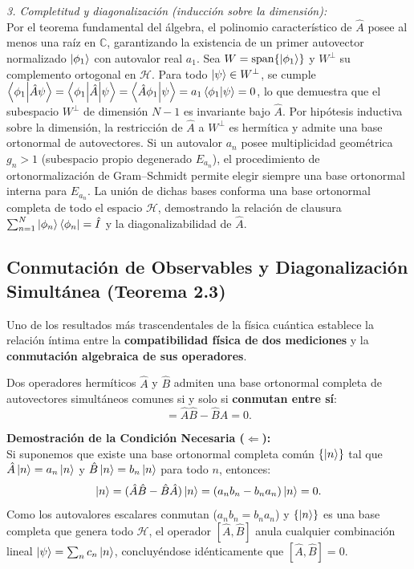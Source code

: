 \textit{3. Completitud y diagonalización (inducción sobre la dimensión):}\\
Por el teorema fundamental del álgebra, el polinomio característico de $\hat{A}$ posee al menos una raíz en $\mathbb{C}$, garantizando la existencia de un primer autovector normalizado $\left| \phi_1 \right\rangle$ con autovalor real $a_1$. Sea $W = \mathrm{span}\{\left| \phi_1 \right\rangle\}$ y $W^\perp$ su complemento ortogonal en $\mathcal{H}$. Para todo $\left| \psi \right\rangle \in W^\perp$, se cumple $\left\langle \phi_1 \middle| \hat{A}\psi \right\rangle = \left\langle \phi_1 \middle| \hat{A} \middle| \psi \right\rangle = \left\langle \hat{A}\phi_1 \middle| \psi \right\rangle = a_1\left\langle \phi_1 \middle| \psi \right\rangle = 0$, lo que demuestra que el subespacio $W^\perp$ de dimensión $N-1$ es invariante bajo $\hat{A}$. Por hipótesis inductiva sobre la dimensión, la restricción de $\hat{A}$ a $W^\perp$ es hermítica y admite una base ortonormal de autovectores. Si un autovalor $a_n$ posee multiplicidad geométrica $g_n > 1$ (subespacio propio degenerado $E_{a_n}$), el procedimiento de ortonormalización de Gram--Schmidt permite elegir siempre una base ortonormal interna para $E_{a_n}$. La unión de dichas bases conforma una base ortonormal completa de todo el espacio $\mathcal{H}$, demostrando la relación de clausura $\sum_{n=1}^N \left| \phi_n \right\rangle\left\langle \phi_n \right| = \hat{I}$ y la diagonalizabilidad de $\hat{A}$.

\subsection{Conmutación de Observables y Diagonalización Simultánea (Teorema 2.3)}
\label{subsec:teorema_2_3}

Uno de los resultados más trascendentales de la física cuántica establece la relación íntima entre la \textbf{compatibilidad física de dos mediciones} y la \textbf{conmutación algebraica de sus operadores}.

\begin{teoremabox}
    Dos operadores hermíticos $\hat{A}$ y $\hat{B}$ admiten una base ortonormal completa de autovectores simultáneos comunes si y solo si \textbf{conmutan entre sí}:
    \begin{equation}
        [\hat{A}, \hat{B}] = \hat{A}\hat{B} - \hat{B}\hat{A} = 0.
    \end{equation}
\end{teoremabox}

\textbf{Demostración de la Condición Necesaria ($\Leftarrow$):}\\
Si suponemos que existe una base ortonormal completa común $\{\left| n \right\rangle\}$ tal que $\hat{A}\left| n \right\rangle = a_n\left| n \right\rangle$ y $\hat{B}\left| n \right\rangle = b_n\left| n \right\rangle$ para todo $n$, entonces:
\begin{equation}
    [\hat{A}, \hat{B}]\ket{n} = (\hat{A}\hat{B} - \hat{B}\hat{A})\ket{n} = (a_n b_n - b_n a_n)\ket{n} = 0.
    \label{a1-eq:comm_necessary}
\end{equation}
Como los autovalores escalares conmutan ($a_n b_n = b_n a_n$) y $\{\left| n \right\rangle\}$ es una base completa que genera todo $\mathcal{H}$, el operador $[\hat{A}, \hat{B}]$ anula cualquier combinación lineal $\left| \psi \right\rangle = \sum_n c_n\left| n \right\rangle$, concluyéndose idénticamente que $[\hat{A}, \hat{B}] = 0$.

